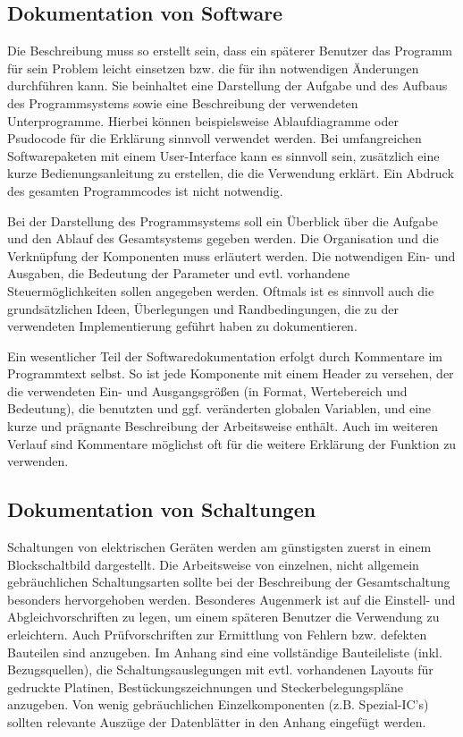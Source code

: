\subsection{Dokumentation von Software}
Die Beschreibung muss so erstellt sein, dass ein späterer Benutzer das Programm für sein Problem
leicht einsetzen bzw. die für ihn notwendigen Änderungen durchführen kann. Sie beinhaltet eine
Darstellung der Aufgabe und des Aufbaus des Programmsystems sowie eine Beschreibung der verwendeten
Unterprogramme. Hierbei können beispielsweise Ablaufdiagramme oder Psudocode für die Erklärung
sinnvoll verwendet werden. Bei umfangreichen Softwarepaketen mit einem User-Interface kann es
sinnvoll sein, zusätzlich eine kurze Bedienungsanleitung zu erstellen, die die Verwendung erklärt.
Ein Abdruck des gesamten Programmcodes ist nicht notwendig.

Bei der Darstellung des Programmsystems soll ein Überblick über die Aufgabe und den Ablauf des
Gesamtsystems gegeben werden. Die Organisation und die Verknüpfung der Komponenten muss erläutert
werden. Die notwendigen Ein- und Ausgaben, die Bedeutung der Parameter und evtl. vorhandene
Steuermöglichkeiten sollen angegeben werden. Oftmals ist es sinnvoll auch die grundsätzlichen
Ideen, Überlegungen und Randbedingungen, die zu der verwendeten Implementierung geführt haben zu
dokumentieren.

Ein wesentlicher Teil der Softwaredokumentation erfolgt durch Kommentare im Programmtext selbst. So
ist jede Komponente mit einem Header zu versehen, der die verwendeten Ein- und Ausgangsgrößen (in
Format, Wertebereich und Bedeutung), die benutzten und ggf. veränderten globalen Variablen, und
eine kurze und prägnante Beschreibung der Arbeitsweise enthält. Auch im weiteren Verlauf sind
Kommentare möglichst oft für die weitere Erklärung der Funktion zu verwenden.


\subsection{Dokumentation von Schaltungen}
Schaltungen von elektrischen Geräten werden am günstigsten zuerst in einem Blockschaltbild
dargestellt. Die Arbeitsweise von einzelnen, nicht allgemein gebräuchlichen Schaltungsarten sollte
bei der Beschreibung der Gesamtschaltung besonders hervorgehoben werden. Besonderes Augenmerk ist
auf die Einstell- und Abgleichvorschriften zu legen, um einem späteren Benutzer die Verwendung zu
erleichtern. Auch Prüfvorschriften zur Ermittlung von Fehlern bzw. defekten Bauteilen sind
anzugeben. Im Anhang sind eine vollständige Bauteileliste (inkl. Bezugsquellen), die
Schaltungsauslegungen mit evtl. vorhandenen Layouts für gedruckte Platinen, Bestückungszeichnungen
und Steckerbelegungspläne anzugeben. Von wenig gebräuchlichen Einzelkomponenten (z.B. Spezial-IC's)
sollten relevante Auszüge der Datenblätter in den Anhang eingefügt werden.

